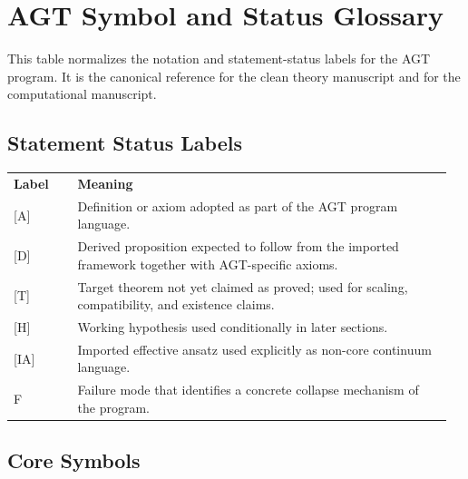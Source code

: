 \section*{AGT Symbol and Status Glossary}

This table normalizes the notation and statement-status labels for the AGT program. It is the canonical reference for the clean theory manuscript and for the computational manuscript.

\subsection*{Statement Status Labels}

\begingroup
\small
\setlength{\tabcolsep}{3pt}
\begin{longtable}{@{}L{0.14\linewidth}L{0.82\linewidth}@{}}
\textbf{Label} & \textbf{Meaning} \\
{[A]} & Definition or axiom adopted as part of the AGT program language. \\
{[D]} & Derived proposition expected to follow from the imported framework together with AGT-specific axioms. \\
{[T]} & Target theorem not yet claimed as proved; used for scaling, compatibility, and existence claims. \\
{[H]} & Working hypothesis used conditionally in later sections. \\
{[IA]} & Imported effective ansatz used explicitly as non-core continuum language. \\
F & Failure mode that identifies a concrete collapse mechanism of the program. \\
\end{longtable}

\subsection*{Core Symbols}

